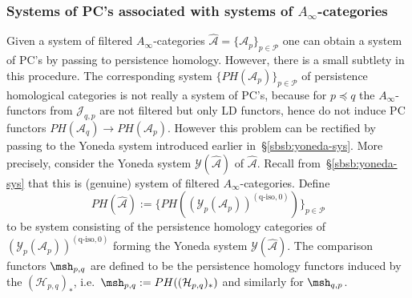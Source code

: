 \subsubsection{Systems of PC's associated with systems of
  $A_{\infty}$-categories} \label{sbsb:sys-ai-pc} Given a system of
filtered $A_{\infty}$-categories
$\widehat{\mathcal{A}} = \{ \mathcal{A}_p\}_{p \in \mathcal{P}}$ one
can obtain a system of PC's by passing to persistence
homology. However, there is a small subtlety in this procedure. The
corresponding system $\{PH(\mathcal{A}_p)\}_{p \in \mathcal{P}}$ of
persistence homological categories is not really a system of PC's,
because for $p \preceq q$ the $A_{\infty}$-functors from
$\mathcal{J}_{q,p}$ are not filtered but only LD functors, hence do not
induce PC functors
$PH(\mathcal{A}_q) \longrightarrow PH(\mathcal{A}_p)$. However this
problem can be rectified by passing to the Yoneda system introduced
earlier in~\S\ref{sbsb:yoneda-sys}. More precisely, consider the
Yoneda system $\mathcal{Y}(\widehat{\mathcal{A}})$ of
$\widehat{\mathcal{A}}$. Recall from~\S\ref{sbsb:yoneda-sys} that this
is (genuine) system of filtered $A_{\infty}$-categories. Define
$$PH(\widehat{\mathcal{A}}) :=
\{PH((\mathcal{Y}_p(\mathcal{A}_p))^{(\text{q-iso},0)})\}_{p \in
  \mathcal{P}}$$ to be system consisting of the persistence homology
categories of $(\mathcal{Y}_p(\mathcal{A}_p))^{(\text{q-iso},0)}$
forming the Yoneda system $\mathcal{Y}(\widehat{\mathcal{A}})$. The
comparison functors $\msh_{p,q}$ are defined to be the persistence
homology functors induced by the $(\mathcal{H}_{p,q})_*$,
i.e.~$\msh_{p,q} := PH((\mathcal{H}_{p,q})_*)$ and similarly for
$\msh_{q,p}$.
  



